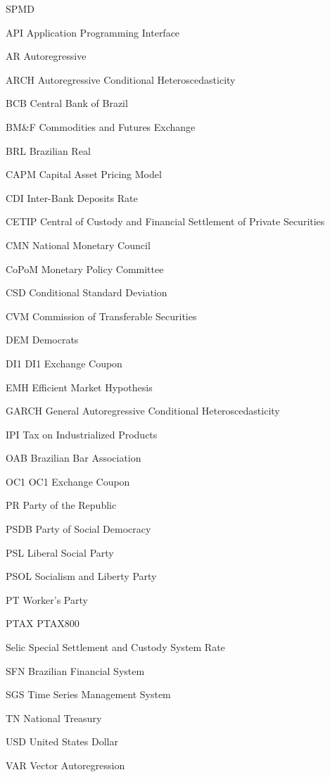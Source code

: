 \documentclass[cic,tc, english]{iiufrgs}
\begin{document}
\begin{listofabbrv}{SPMD}
    
    \item[API] Application Programming Interface
    \item[AR] Autoregressive
    \item[ARCH]    Autoregressive Conditional Heteroscedasticity
    \item[BCB] Central Bank of Brazil
    \item[BM\&F] Commodities and Futures Exchange
    \item[BRL] Brazilian Real
    \item[CAPM] Capital Asset Pricing Model
    \item[CDI] Inter-Bank Deposits Rate
    \item[CETIP] Central of Custody and Financial Settlement of Private Securities
    \item[CMN] National Monetary Council
    \item[CoPoM] Monetary Policy Committee
    \item[CSD] Conditional Standard Deviation
    \item[CVM] Commission of Transferable Securities
    \item[DEM] Democrats
    \item[DI1] DI1 Exchange Coupon
    \item[EMH] Efficient Market Hypothesis
    \item[GARCH] General Autoregressive Conditional Heteroscedasticity
    \item[IPI] Tax on Industrialized Products
    \item[OAB] Brazilian Bar Association
    \item[OC1] OC1 Exchange Coupon
    \item[PR] Party of the Republic
    \item[PSDB]    Party of Social Democracy
    \item[PSL] Liberal Social Party
    \item[PSOL] Socialism and Liberty Party
    \item[PT] Worker's Party
    \item[PTAX] PTAX800
    \item[Selic] Special Settlement and Custody System Rate
    \item[SFN] Brazilian Financial System
    \item[SGS] Time Series Management System
    \item[TN] National Treasury
    \item[USD] United States Dollar
    \item[VAR] Vector Autoregression

\end{listofabbrv}
\end{document}

